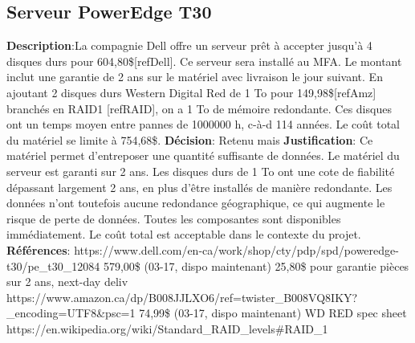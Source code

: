 

\subsection{Serveur PowerEdge T30}
\label{s:archiver_conc1}

\textbf{Description}:La compagnie Dell offre un serveur prêt à accepter jusqu’à 4 disques durs pour 604,80\$[refDell]. Ce serveur sera installé au MFA. Le montant inclut une garantie de 2 ans sur le matériel avec livraison le jour suivant. En ajoutant 2 disques durs Western Digital Red de 1 To pour 149,98\$[refAmz] branchés en RAID1 [refRAID], on a 1 To de mémoire redondante. Ces disques ont un temps moyen entre pannes de 1000000 h, c-à-d 114 années.  Le coût total du matériel se limite à 754,68\$. 
\textbf{Décision}: Retenu mais 
\textbf{Justification}: Ce matériel permet d’entreposer une quantité suffisante de données. Le matériel du serveur est garanti sur 2 ans. Les disques durs de 1 To ont une cote de fiabilité dépassant largement 2 ans, en plus d’être installés de manière redondante. Les données n’ont toutefois aucune redondance géographique, ce qui augmente le risque de perte de données. Toutes les composantes sont disponibles immédiatement. Le coût total est acceptable dans le contexte du projet.
\textbf{Références}: 
https://www.dell.com/en-ca/work/shop/cty/pdp/spd/poweredge-t30/pe\_t30\_12084
579,00\$ (03-17, dispo maintenant)
25,80\$ pour garantie pièces sur 2 ans, next-day deliv
https://www.amazon.ca/dp/B008JJLXO6/ref=twister\_B008VQ8IKY?\_encoding=UTF8\&psc=1
74,99\$ (03-17, dispo maintenant)
WD RED spec sheet
https://en.wikipedia.org/wiki/Standard\_RAID\_levels#RAID\_1

